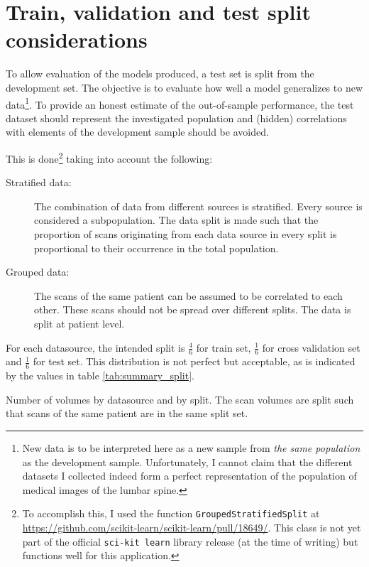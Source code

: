 \section{Train, validation and test split considerations\label{sec:trainValTestSplit}}

To allow evaluation of the models produced, a test set is split from the development set.
The objective is to evaluate how well a model generalizes to new data\footnote{
    New data is to be interpreted here as a new sample from \textit{the same population} as the development sample.
    Unfortunately, I cannot claim that the different datasets I collected indeed form a perfect representation of the population of medical images of the lumbar spine.}. 
To provide an honest estimate of the out-of-sample performance, the test dataset should represent the investigated population and (hidden) correlations with elements of the development sample should be avoided.

This is done\footnote{
    To accomplish this, I used the function \texttt{GroupedStratifiedSplit} at \url{https://github.com/scikit-learn/scikit-learn/pull/18649/}. 
    This class is not yet part of the official \texttt{sci-kit learn} library release (at the time of writing) but functions well for this application.} taking into account the following:
\begin{description}
    \item[Stratified data:] The combination of data from different sources is stratified. Every source is considered a subpopulation. The data split is made such that the proportion of scans originating from each data source in every split is proportional to their occurrence in the total population.
    \item[Grouped data:] The scans of the same patient can be assumed to be correlated to each other. These scans should not be spread over different splits. The data is split at patient level.
\end{description}

For each datasource, the intended split is $\frac{4}{6}$ for train set, $\frac{1}{6}$ for cross validation set and $\frac{1}{6}$ for test set.
This distribution is not perfect but acceptable, as is indicated by the values in table \ref{tab:summary_split}.

\begin{SCtable}[\sidecaptionrelwidth][h]
 
    
    \caption{Number of volumes by datasource and by split. The scan volumes are split such that scans of the same patient are in the same split set.\label{tab:summary_split}}
  
  \end{SCtable}

